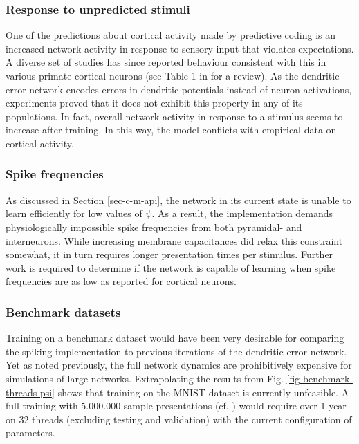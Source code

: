 \subsubsection*{Response to unpredicted stimuli}
One of the predictions about cortical activity made by predictive coding is an increased network activity in response to
sensory input that violates expectations. A diverse set of studies has since reported behaviour consistent with this in
various primate cortical neurons (see Table 1 in \citep{bastos2012canonical} for a review). As the dendritic error
network encodes errors in dendritic potentials instead of neuron activations, experiments proved that it does not
exhibit this property in any of its populations. In fact, overall network activity in response to a stimulus seems to
increase after training. In this way, the model conflicts with empirical data on cortical activity.

\subsubsection*{Spike frequencies}

As discussed in Section \ref{sec-c-m-api}, the network in its current state is unable to learn efficiently for low
values of $\psi$. As a result, the implementation demands physiologically impossible spike frequencies from both
pyramidal- and interneurons. While increasing membrane capacitances did relax this constraint somewhat, it in turn
requires longer presentation times per stimulus. Further work is required to determine if the network is capable of
learning when spike frequencies are as low as reported for cortical neurons.

\subsubsection*{Benchmark datasets}

Training on a benchmark dataset would have been very desirable for comparing the spiking implementation to previous
iterations of the dendritic error network. Yet as noted previously, the full network dynamics are prohibitively
expensive for simulations of large networks. Extrapolating the results from Fig. \ref{fig-benchmark-threads-psi} shows
that training on the MNIST dataset is currently unfeasible. A full training with $5.000.000$ sample
presentations (cf. \cite{Haider2021}) would require over 1 year on 32 threads (excluding testing and validation) with
the current configuration of parameters.

